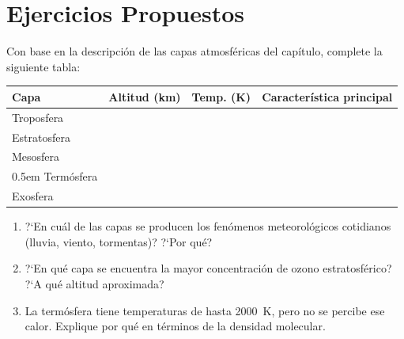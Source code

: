 
\section*{Ejercicios Propuestos}
\label{sec:ejercicios_cap05}

\begin{bloque_ejercicios}

\begin{ejercicios}

\item Con base en la descripci\'on de las capas atmosf\'ericas
del cap\'itulo, complete la siguiente tabla:

{%
\centering
\begin{tabular}{lp{2.5cm}p{2.5cm}p{3.0cm}}
\toprule
\textbf{Capa} & \textbf{Altitud (km)} & \textbf{Temp. (K)} &
\textbf{Caracter\'istica principal} \\
\midrule
Troposfera    & & & \\
Estratosfera  & & & \\
Mesosfera     & & & \\{0.5em}
Term\'osfera  & & & \\
Exosfera      & & & \\
\bottomrule
\end{tabular}
\par
}%

\begin{enumerate}[label=\alph*)]
    \item ?`En cu\'al de las capas se producen los fen\'omenos
          meteorol\'ogicos cotidianos (lluvia, viento, tormentas)?
          ?`Por qu\'e?
    \item ?`En qu\'e capa se encuentra la mayor concentraci\'on
          de ozono estratosf\'erico? ?`A qu\'e altitud aproximada?
    \item La term\'osfera tiene temperaturas de hasta
          \SI{2000}{\kelvin}, pero no se percibe ese calor.
          Explique por qu\'e en t\'erminos de la densidad molecular.
\end{enumerate}


\end{ejercicios}
\end{bloque_ejercicios}
